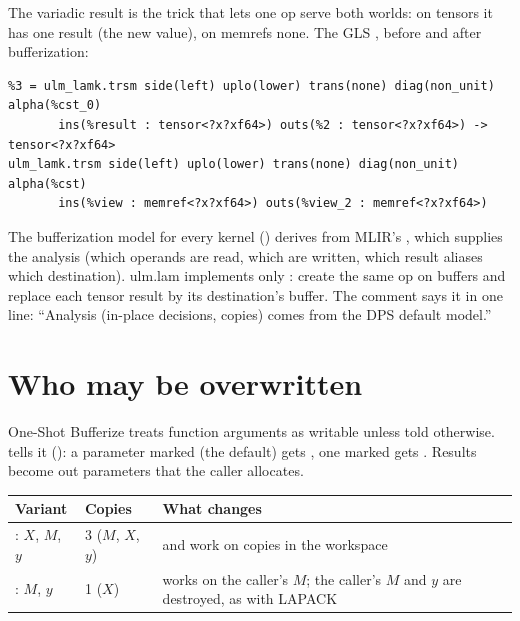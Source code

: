 The variadic result is the trick that lets one op serve both worlds: on
tensors it has one result (the new value), on memrefs none. The GLS
, before and after bufferization:

\begin{lstlisting}
%3 = ulm_lamk.trsm side(left) uplo(lower) trans(none) diag(non_unit) alpha(%cst_0)
       ins(%result : tensor<?x?xf64>) outs(%2 : tensor<?x?xf64>) -> tensor<?x?xf64>
ulm_lamk.trsm side(left) uplo(lower) trans(none) diag(non_unit) alpha(%cst)
       ins(%view : memref<?x?xf64>) outs(%view_2 : memref<?x?xf64>)
\end{lstlisting}

The bufferization model for every kernel
() derives from MLIR's
, which supplies the analysis
(which operands are read, which are written, which result aliases which
destination). ulm.lam implements only : create the same
op on buffers and replace each tensor result by its destination's buffer.
The comment says it in one line: ``Analysis (in-place decisions, copies)
comes from the DPS default model.''

\section{Who may be overwritten}
\label{sec:storage-intent}

One-Shot Bufferize treats function arguments as writable unless told
otherwise.  tells it
(): a parameter marked
 (the default) gets ,
one marked  gets . Results become out
parameters that the caller allocates.

\begin{center}\small
\begin{tabularx}{\linewidth}{@{}P{3.6cm}P{2.6cm}L@{}}
\toprule
\textbf{Variant} & \textbf{Copies} & \textbf{What changes} \\
\midrule
{}: \(X\), \(M\), \(y\)  & 3 (\(M\), \(X\), \(y\)) &
   and  work on copies in the workspace \\
: \(M\), \(y\)  & 1 (\(X\)) &  works on the caller's \(M\); the caller's
  \(M\) and \(y\) are destroyed, as with LAPACK \\
\bottomrule
\end{tabularx}
\end{center}

